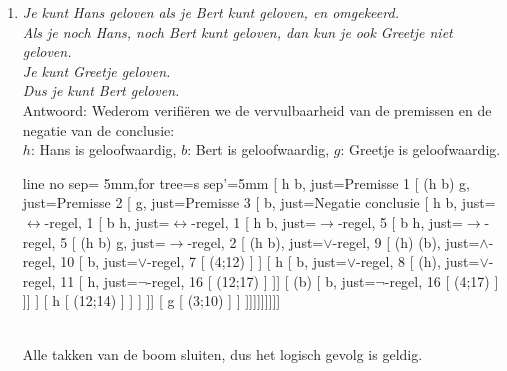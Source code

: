 \begin{answer}
\begin{enumerate}[label=\textit{\alph*.}]
\newpage
\item\textit{Je kunt Hans geloven als je Bert kunt geloven, en omgekeerd.}\\
\textit{Als je noch Hans, noch Bert kunt geloven, dan kun je ook Greetje niet geloven.}\\
\textit{Je kunt Greetje geloven.}\\
\textit{Dus je kunt Bert geloven.}\\
Antwoord: Wederom verifi\"eren we de vervulbaarheid van de premissen en de negatie van de conclusie:\\
    $h$: Hans is geloofwaardig, $b$: Bert is geloofwaardig, $g$: Greetje is geloofwaardig.
\begin{center}
\begin{tableau}{line no sep= 5mm,for tree={s sep'=5mm}}
[ h \leftrightarrow b,                     just={Premisse 1}
[ (\neg h \land \neg b) \to \neg g,        just={Premisse 2}
[ g,                                       just={Premisse 3}
[ \neg b,                                  just={Negatie conclusie}
[ h \to b,                                 just={$\leftrightarrow$-regel, 1}
[ b \to h,                                 just={$\leftrightarrow$-regel, 1}
[ \neg h \lor b,                           just={$\to$-regel, 5}
[ \neg b \lor h,                           just={$\to$-regel, 5}
[ \neg (\neg h \land \neg b) \lor \neg g,  just={$\to$-regel, 2}
  [ \neg (\neg h \land \neg b),            just={$\lor$-regel, 9}
  [ \neg (\neg h) \lor \neg (\neg b),      just={$\land$-regel, 10}
    [ b,                                   just={$\lor$-regel, 7}
      [ \bot (4;12) ]
    ]
    [ \neg h
      [ \neg b,                            just={$\lor$-regel, 8}
        [ \neg (\neg h),                   just={$\lor$-regel, 11}
        [ h,                               just={$\neg$-regel, 16}
          [ \bot (12;17) ]
        ]]
        [ \neg (\neg b)
        [ b,                               just={$\neg$-regel, 16}
          [ \bot (4;17) ]
        ]]
      ]
      [ h
        [ \bot (12;14) ]
      ]
    ]
  ]]
  [ \neg g
    [ \bot (3;10) ]
  ]
]]]]]]]]]
\end{tableau}\\[3mm]
Alle takken van de boom sluiten, dus het logisch gevolg is geldig.
\end{center}
\end{enumerate}

\end{answer}
